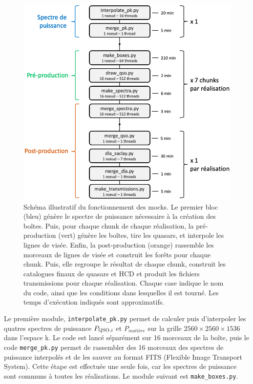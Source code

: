 \documentclass[11pt, twoside, a4paper, openright]{report}
\begin{document}
\begin{figure}
  \centering
  \includegraphics[scale=0.55]{schema_prod}
  \caption{Schéma illustratif du fonctionnement des mocks. Le premier bloc (bleu) génère le spectre de puissance nécessaire à la création des boîtes. Puis, pour chaque chunk de chaque réalisation, la pré-production (vert) génère les boîtes, tire les quasars, et interpole les lignes de visée. Enfin, la post-production (orange) rassemble les morceaux de lignes de visée et construit les forêts \lya{} pour chaque chunk. Puis, elle regroupe le résultat de chaque chunk, construit les catalogues finaux de quasars et HCD et produit les fichiers transmissions pour chaque réalisation. Chaque case indique le nom du code, ainsi que les conditions dans lesquelles il est tourné. Les temps d'exécution indiqués sont approximatifs.}
  \label{fig:schema_prod}
\end{figure}
Le première module, \texttt{interpolate\_pk.py} permet de calculer puis d'interpoler les quatres spectres de puissance $P_{\textsc{QSO},i}$ et $P_{matière}$ sur la grille $\num{2560}\times\num{2560}\times\num{1536}$ dans l'espace k. Le code est lancé séparément sur 16 morceaux de la boîte, puis le code \texttt{merge\_pk.py} permet de rassembler des 16 morceaux des spectres de puissance interpolés et de les sauver au format FITS (Flexible Image Transport System). Cette étape est effectuée une seule fois, car les spectres de puissance sont communs à toutes les réalisations. Le module suivant est \texttt{make\_boxes.py}.
\end{document}
